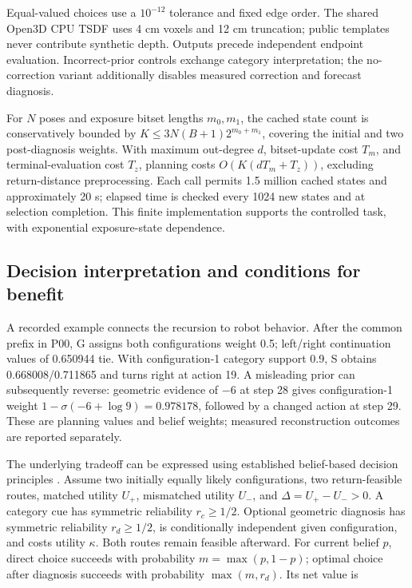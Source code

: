 \documentclass[11pt,a4paper]{article}
\providecommand{\hypertarget}[2]{#2}
\begin{document}
Equal-valued choices use a \(10^{-12}\) tolerance and fixed edge order. The shared Open3D CPU TSDF \cite{ref4,ref11} uses 4 cm voxels and 12 cm truncation; public templates never contribute synthetic depth. Outputs precede independent endpoint evaluation. Incorrect-prior controls exchange category interpretation; the no-correction variant additionally disables measured correction and forecast diagnosis.

For \(N\) poses and exposure bitset lengths \(m_0,m_1\), the cached state count is conservatively bounded by \(K\le3N(B+1)2^{m_0+m_1}\), covering the initial and two post-diagnosis weights. With maximum out-degree \(d\), bitset-update cost \(T_m\), and terminal-evaluation cost \(T_z\), planning costs \(O(K(dT_m+T_z))\), excluding return-distance preprocessing. Each call permits 1.5 million cached states and approximately 20 s; elapsed time is checked every 1024 new states and at selection completion. This finite implementation supports the controlled task, with exponential exposure-state dependence.

\hypertarget{decision-interpretation-and-conditions-for-benefit}{%
\subsection{Decision interpretation and conditions for benefit}\label{decision-interpretation-and-conditions-for-benefit}}

A recorded example connects the recursion to robot behavior. After the common prefix in P00, G assigns both configurations weight 0.5; left/right continuation values of 0.650944 tie. With configuration-1 category support 0.9, S obtains 0.668008/0.711865 and turns right at action 19. A misleading prior can subsequently reverse: geometric evidence of \(-6\) at step 28 gives configuration-1 weight \(1-\sigma(-6+\log9)=0.978178\), followed by a changed action at step 29. These are planning values and belief weights; measured reconstruction outcomes are reported separately.

The underlying tradeoff can be expressed using established belief-based decision principles \cite{ref12,ref13}. Assume two initially equally likely configurations, two return-feasible routes, matched utility \(U_+\), mismatched utility \(U_-\), and \(\Delta=U_+-U_->0\). A category cue has symmetric reliability \(r_c\ge1/2\). Optional geometric diagnosis has symmetric reliability \(r_d\ge1/2\), is conditionally independent given configuration, and costs utility \(\kappa\). Both routes remain feasible afterward. For current belief \(p\), direct choice succeeds with probability \(m=\max(p,1-p)\); optimal choice after diagnosis succeeds with probability \(\max(m,r_d)\). Its net value is
\end{document}
